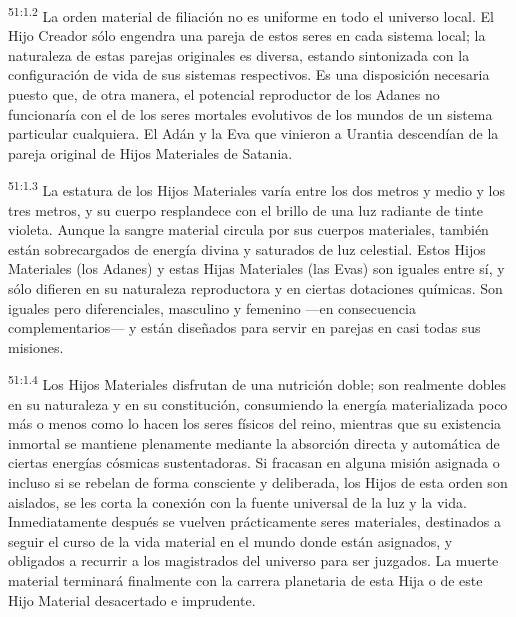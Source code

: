 \par
\textsuperscript{51:1.2} La orden material de filiación no es uniforme en todo el universo local. El Hijo Creador sólo engendra una pareja de estos seres en cada sistema local; la naturaleza de estas parejas originales es diversa, estando sintonizada con la configuración de vida de sus sistemas respectivos. Es una disposición necesaria puesto que, de otra manera, el potencial reproductor de los Adanes no funcionaría con el de los seres mortales evolutivos de los mundos de un sistema particular cualquiera. El Adán y la Eva que vinieron a Urantia descendían de la pareja original de Hijos Materiales de Satania.

\par
\textsuperscript{51:1.3} La estatura de los Hijos Materiales varía entre los dos metros y medio y los tres metros, y su cuerpo resplandece con el brillo de una luz radiante de tinte violeta. Aunque la sangre material circula por sus cuerpos materiales, también están sobrecargados de energía divina y saturados de luz celestial. Estos Hijos Materiales (los Adanes) y estas Hijas Materiales (las Evas) son iguales entre sí, y sólo difieren en su naturaleza reproductora y en ciertas dotaciones químicas. Son iguales pero diferenciales, masculino y femenino ---en consecuencia complementarios--- y están diseñados para servir en parejas en casi todas sus misiones.

\par
\textsuperscript{51:1.4} Los Hijos Materiales disfrutan de una nutrición doble; son realmente dobles en su naturaleza y en su constitución, consumiendo la energía materializada poco más o menos como lo hacen los seres físicos del reino, mientras que su existencia inmortal se mantiene plenamente mediante la absorción directa y automática de ciertas energías cósmicas sustentadoras. Si fracasan en alguna misión asignada o incluso si se rebelan de forma consciente y deliberada, los Hijos de esta orden son aislados, se les corta la conexión con la fuente universal de la luz y la vida. Inmediatamente después se vuelven prácticamente seres materiales, destinados a seguir el curso de la vida material en el mundo donde están asignados, y obligados a recurrir a los magistrados del universo para ser juzgados. La muerte material terminará finalmente con la carrera planetaria de esta Hija o de este Hijo Material desacertado e imprudente.

